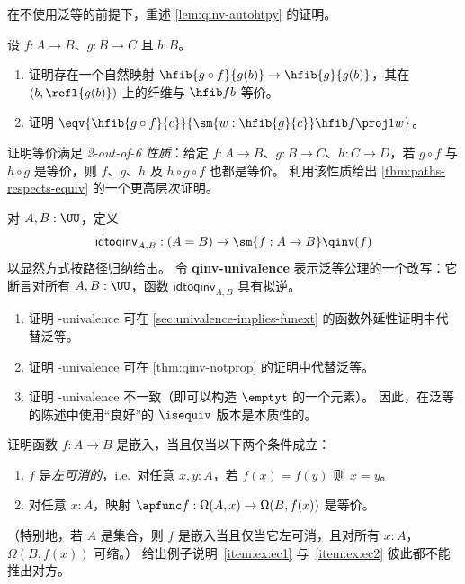 \begin{ex} \label{ex:qinv-autohtpy-no-univalence}
  在不使用泛等的前提下，重述 \cref{lem:qinv-autohtpy} 的证明。
\end{ex}

\begin{ex}[不稳定八面体公理]\label{ex:unstable-octahedron}
  设 $f:A\to B$、$g:B\to C$ 且 $b:B$。
  \begin{enumerate}
  \item 证明存在一个自然映射 $\hfib{g\circ f}{g(b)} \to \hfib{g}{g(b)}$，其在 $(b,\refl{g(b)})$ 上的纤维与 $\hfib f b$ 等价。
  \item 证明 $\eqv{\hfib{g\circ f}{c}}{\sm{w:\hfib{g}{c}} \hfib f {\proj1 w}}$。
  \end{enumerate}
\end{ex}

\begin{ex}\label{ex:2-out-of-6}
  证明等价满足 \emph{2-out-of-6 性质}：给定 $f:A\to B$、$g:B\to C$、$h:C\to D$，若 $g\circ f$ 与 $h\circ g$ 是等价，则 $f$、$g$、$h$ 及 $h\circ g\circ f$ 也都是等价。
  利用该性质给出 \cref{thm:paths-respects-equiv} 的一个更高层次证明。
\end{ex}

\begin{ex}\label{ex:qinv-univalence}
  对 $A,B:\UU$，定义
  \[ \mathsf{idtoqinv}_{A,B} :(A=B) \to \sm{f:A\to B}\qinv(f) \]
  以显然方式按路径归纳给出。
  令 \textbf{\textsf{qinv}-univalence} 表示泛等公理的一个改写：它断言对所有 $A,B:\UU$，函数 $\mathsf{idtoqinv}_{A,B}$ 具有拟逆。
  \begin{enumerate}
  \item 证明 \qinv-univalence 可在 \cref{sec:univalence-implies-funext} 的函数外延性证明中代替泛等。
  \item 证明 \qinv-univalence 可在 \cref{thm:qinv-notprop} 的证明中代替泛等。
  \item 证明 \qinv-univalence 不一致（即可以构造 $\emptyt$ 的一个元素）。
    因此，在泛等的陈述中使用“良好”的 $\isequiv$ 版本是本质性的。
  \end{enumerate}
\end{ex}

\begin{ex}\label{ex:embedding-cancellable}
  证明函数 $f:A\to B$ 是嵌入，当且仅当以下两个条件成立：
  \begin{enumerate}
  \item $f$ 是\emph{左可消的}，i.e.\ 对任意 $x,y:A$，若 $f(x)=f(y)$ 则 $x=y$。\label{item:ex:ec1}
  \item 对任意 $x:A$，映射 $\apfunc f: \Omega(A,x) \to \Omega(B,f(x))$ 是等价。\label{item:ex:ec2}
  \end{enumerate}
  （特别地，若 $A$ 是集合，则 $f$ 是嵌入当且仅当它左可消，且对所有 $x:A$，$\Omega(B,f(x))$ 可缩。）
  给出例子说明~\ref{item:ex:ec1} 与~\ref{item:ex:ec2} 彼此都不能推出对方。
\end{ex}

